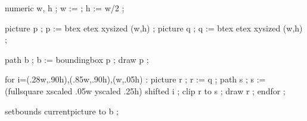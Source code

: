 \startMPpage
    numeric w, h ; w := \the\textwidth ; h := w/2 ; %

    picture p ; p := btex  etex xysized (w,h) ;
    picture q ; q := btex  etex xysized (w,h) ;

    path b ; b := boundingbox p ; draw p ;

    for i=(.28w,.90h),(.85w,.90h),(w,.05h) :
      picture r ; r := q ;
      path s ; s := (fullsquare xscaled .05w yscaled .25h) shifted i ;
      clip r to s ; draw r ; %
    endfor ;

    setbounds currentpicture to b ;
\stopMPpage
